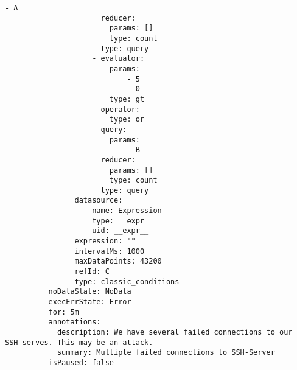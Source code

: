 {\begin{Verbatim}[frame=single]
                            - A
                      reducer:
                        params: []
                        type: count
                      type: query
                    - evaluator:
                        params:
                            - 5
                            - 0
                        type: gt
                      operator:
                        type: or
                      query:
                        params:
                            - B
                      reducer:
                        params: []
                        type: count
                      type: query
                datasource:
                    name: Expression
                    type: __expr__
                    uid: __expr__
                expression: ""
                intervalMs: 1000
                maxDataPoints: 43200
                refId: C
                type: classic_conditions
          noDataState: NoData
          execErrState: Error
          for: 5m
          annotations:
            description: We have several failed connections to our SSH-serves. This may be an attack.
            summary: Multiple failed connections to SSH-Server
          isPaused: false
  
\end{Verbatim}
}